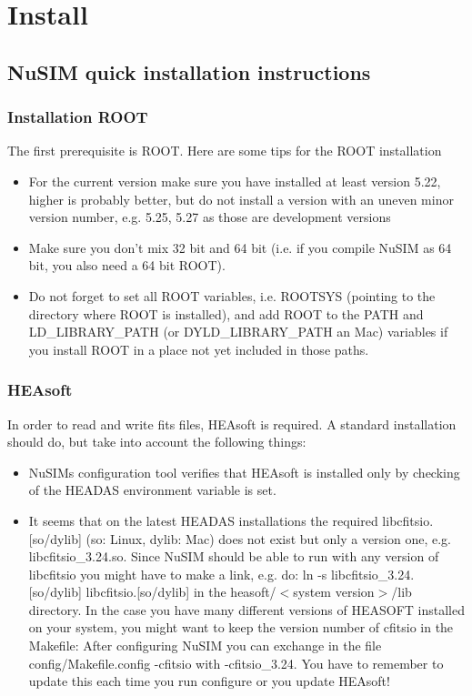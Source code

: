 \chapter{Install}

\section{NuSIM quick installation instructions}
\subsection{Installation ROOT}

The first prerequisite is ROOT. Here are some tips for the ROOT installation
\begin{itemize}
\item For the current version make sure you have installed at least version 5.22, higher is probably  better, but do not install a version with an uneven minor version number, e.g. 5.25, 5.27 as those are development versions
\item Make sure you don't mix 32 bit and 64 bit (i.e. if you compile NuSIM as 64 bit, you also need a 64 bit ROOT).
\item Do not forget to set all ROOT variables, i.e. ROOTSYS (pointing to the directory where ROOT is installed), and add ROOT to the PATH and LD\_LIBRARY\_PATH (or DYLD\_LIBRARY\_PATH an Mac) variables if you install ROOT in a place not yet included in those paths. 
\end{itemize}

\subsection{HEAsoft}
In order to read and write fits files, HEAsoft is required. A standard installation should do, but take into account the following things:
\begin{itemize}
\item	NuSIMs configuration tool verifies that HEAsoft is installed only by checking of the HEADAS environment variable is set.
\item	It seems that on the latest HEADAS installations the required libcfitsio.[so/dylib] (so: Linux, dylib: Mac) does not exist but 
only a version one, e.g. libcfitsio\_3.24.so. Since NuSIM should be able to run with any version of libcfitsio you might have to make a link, e.g. do:
ln -s libcfitsio\_3.24.[so/dylib] libcfitsio.[so/dylib]
in the heasoft/$<$system version$>$/lib directory.
In the case you have many different versions of HEASOFT installed on your system, you might want to keep the version number of cfitsio in the Makefile:
After configuring NuSIM you can exchange in the file config/Makefile.config -cfitsio with -cfitsio\_3.24.
You have to remember to update this each time you run configure or you update HEAsoft!
\end{itemize}

